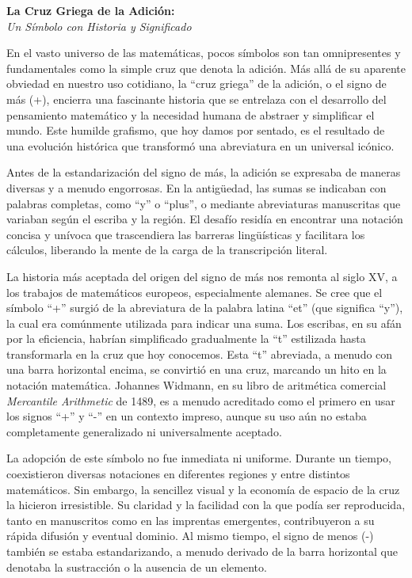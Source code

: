 \documentclass[11pt, a4paper]{article} %
\newcommand{\ensayoTitulo}[2]{%
  \begin{center}
    \vspace*{1cm} %
    {\fontsize{24}{26}\selectfont\textbf{#1}} \\ %
    \vspace{0.3cm} %
    {\fontsize{16}{18}\selectfont\textit{#2}} %
    \vspace*{1.5cm} %
  \end{center}
}
\begin{document}
\ensayoTitulo{La Cruz Griega de la Adición:}{Un Símbolo con Historia y Significado}

En el vasto universo de las matemáticas, pocos símbolos son tan omnipresentes y fundamentales como la simple cruz que denota la adición. Más allá de su aparente obviedad en nuestro uso cotidiano, la ``cruz griega'' de la adición, o el signo de más (+), encierra una fascinante historia que se entrelaza con el desarrollo del pensamiento matemático y la necesidad humana de abstraer y simplificar el mundo. Este humilde grafismo, que hoy damos por sentado, es el resultado de una evolución histórica que transformó una abreviatura en un universal icónico.

Antes de la estandarización del signo de más, la adición se expresaba de maneras diversas y a menudo engorrosas. En la antigüedad, las sumas se indicaban con palabras completas, como ``y'' o ``plus'', o mediante abreviaturas manuscritas que variaban según el escriba y la región. El desafío residía en encontrar una notación concisa y unívoca que trascendiera las barreras lingüísticas y facilitara los cálculos, liberando la mente de la carga de la transcripción literal.

La historia más aceptada del origen del signo de más nos remonta al siglo XV, a los trabajos de matemáticos europeos, especialmente alemanes. Se cree que el símbolo ``+'' surgió de la abreviatura de la palabra latina ``et'' (que significa ``y''), la cual era comúnmente utilizada para indicar una suma. Los escribas, en su afán por la eficiencia, habrían simplificado gradualmente la ``t'' estilizada hasta transformarla en la cruz que hoy conocemos. Esta ``t'' abreviada, a menudo con una barra horizontal encima, se convirtió en una cruz, marcando un hito en la notación matemática. Johannes Widmann, en su libro de aritmética comercial \textit{Mercantile Arithmetic} de 1489, es a menudo acreditado como el primero en usar los signos ``+'' y ``-'' en un contexto impreso, aunque su uso aún no estaba completamente generalizado ni universalmente aceptado.

La adopción de este símbolo no fue inmediata ni uniforme. Durante un tiempo, coexistieron diversas notaciones en diferentes regiones y entre distintos matemáticos. Sin embargo, la sencillez visual y la economía de espacio de la cruz la hicieron irresistible. Su claridad y la facilidad con la que podía ser reproducida, tanto en manuscritos como en las imprentas emergentes, contribuyeron a su rápida difusión y eventual dominio. Al mismo tiempo, el signo de menos (-) también se estaba estandarizando, a menudo derivado de la barra horizontal que denotaba la sustracción o la ausencia de un elemento.
\end{document}
